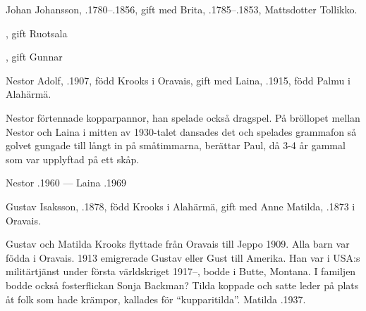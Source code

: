 Johan Johansson, .1780--.1856, gift med Brita, .1785--.1853, Mattsdotter Tollikko.
\begin{jhchildren}
  \item {}, gift Ruotsala
  \item {}
  \item {}
  \item {}
  \item {}
  \item {}, gift Gunnar
  \item {}
  \item {}
  \item {}
\end{jhchildren}





Nestor Adolf, .1907, född Krooks i Oravais, gift med Laina, .1915, född Palmu i Alahärmä.
\begin{jhchildren}
  \item {}
  \item {}
  \item {}
  \item {}
\end{jhchildren}
Nestor förtennade kopparpannor, han spelade också dragspel. På bröllopet mellan Nestor och Laina i mitten av 1930-talet dansades det och spelades grammafon så golvet gungade till långt in på småtimmarna, berättar Paul, då 3-4 år gammal som var upplyftad på ett skåp.

Nestor .1960  ---  Laina .1969


Gustav Isaksson, .1878, född Krooks i Alahärmä, gift med Anne Matilda, .1873 i Oravais.
\begin{jhchildren}
  \item {}
  \item {}
  \item {}
\end{jhchildren}
Gustav och Matilda Krooks flyttade från Oravais till Jeppo 1909. Alla barn var födda i Oravais. 1913 emigrerade Gustav eller Gust till Amerika. Han var i USA:s militärtjänst under första världskriget 1917--, bodde i Butte, Montana. I familjen bodde också fosterflickan Sonja Backman? Tilda koppade och satte leder på plats åt folk som hade krämpor,  kallades för ``kupparitilda''. 	Matilda .1937.



